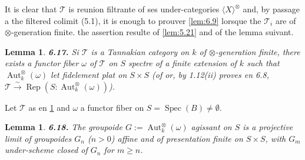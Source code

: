 \documentclass[12pt,a4paper]{article}
\theoremstyle{plain}
\newtheorem{lemma}[theorem]{Lemma}
\theoremstyle{definition}
\theoremstyle{remark}
\DeclareMathOperator{\Aut}{Aut}
\DeclareMathOperator{\Spec}{Spec}
\DeclareMathOperator{\Rep}{Rep}
\begin{document}
It is clear that $\mathcal{T}$ is reunion filtrante of ses under-categories $\langle X \rangle^\otimes$ and, by passage a the filtered colimit (5.1), it is enough to prouver \ref{lem:6.9} lorsque the $\mathcal{T}_i$ are of $\otimes$-generation finite. the assertion resulte of \ref{lem:5.21} and of the lemma suivant.

\begin{lemma}\label{lem:6.17}
\textbf{6.17.} Si $\mathcal{T}$ is a Tannakian category on $k$ of $\otimes$-generation finite, there exists a functor fiber $\omega$ of $\mathcal{T}$ on $S$ spectre of a finite extension of $k$ such that $\Aut^\otimes_k(\omega)$ let fidelement plat on $S \times S$ (of or, by 1.12(ii) proves en 6.8, $\mathcal{T} \xrightarrow{\sim} \Rep(S:\Aut^\otimes_k(\omega))$).
\end{lemma}

Let $\mathcal{T}$ as en \ref{lem:6.17} and $\omega$ a functor fiber on $S = \Spec(B) \neq \emptyset$.

\begin{lemma}\label{lem:6.18}
\textbf{6.18.} The groupoide $G := \Aut^\otimes_k(\omega)$ agissant on $S$ is a projective limit of groupoides $G_n$ ($n > 0$) affine and of presentation finite on $S \times S$, with $G_m$ under-scheme closed of $G_n$ for $m \geq n$.
\end{lemma}
\end{document}
